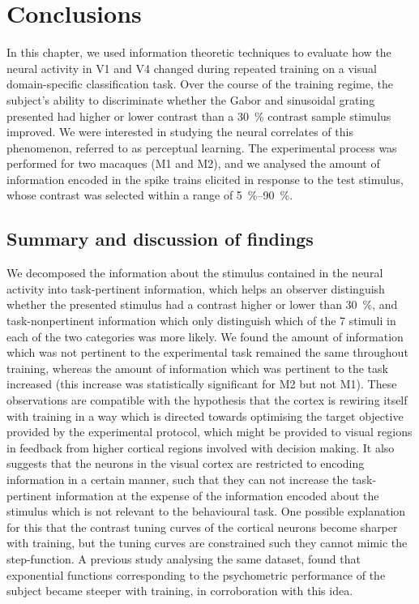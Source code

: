 \section{Conclusions}

In this chapter, we used information theoretic techniques to evaluate how the neural activity in \ac{V1} and \ac{V4} changed during repeated training on a visual domain-specific classification task.
Over the course of the training regime, the subject's ability to discriminate whether the Gabor and sinusoidal grating presented had higher or lower contrast than a \SI{30}{\percent} contrast sample stimulus improved.
We were interested in studying the neural correlates of this phenomenon, referred to as perceptual learning.
The experimental process was performed for two macaques (\ac{M1} and \ac{M2}), and we analysed the amount of information encoded in the spike trains elicited in response to the test stimulus, whose contrast was selected within a range of \SIrange{5}{90}{\percent}.


\subsection{Summary and discussion of findings}

We decomposed the information about the stimulus contained in the neural activity into task-pertinent information, which helps an observer distinguish whether the presented stimulus had a contrast higher or lower than \SI{30}{\percent}, and task-nonpertinent information which only distinguish which of the \num{7} stimuli in each of the two categories was more likely.
We found the amount of information which was not pertinent to the experimental task remained the same throughout training, whereas the amount of information which was pertinent to the task increased (this increase was statistically significant for \ac{M2} but not \ac{M1}).
These observations are compatible with the hypothesis that the cortex is rewiring itself with training in a way which is directed towards optimising the target objective provided by the experimental protocol, which might be provided to visual regions in feedback from higher cortical regions involved with decision making.
It also suggests that the neurons in the visual cortex are restricted to encoding information in a certain manner, such that they can not increase the task-pertinent information at the expense of the information encoded about the stimulus which is not relevant to the behavioural task.
One possible explanation for this that the contrast tuning curves of the cortical neurons become sharper with training, but the tuning curves are constrained such they cannot mimic the step-function.
A previous study analysing the same dataset, \citet{Chen2013} found that exponential functions corresponding to the psychometric performance of the subject became steeper with training, in corroboration with this idea.


